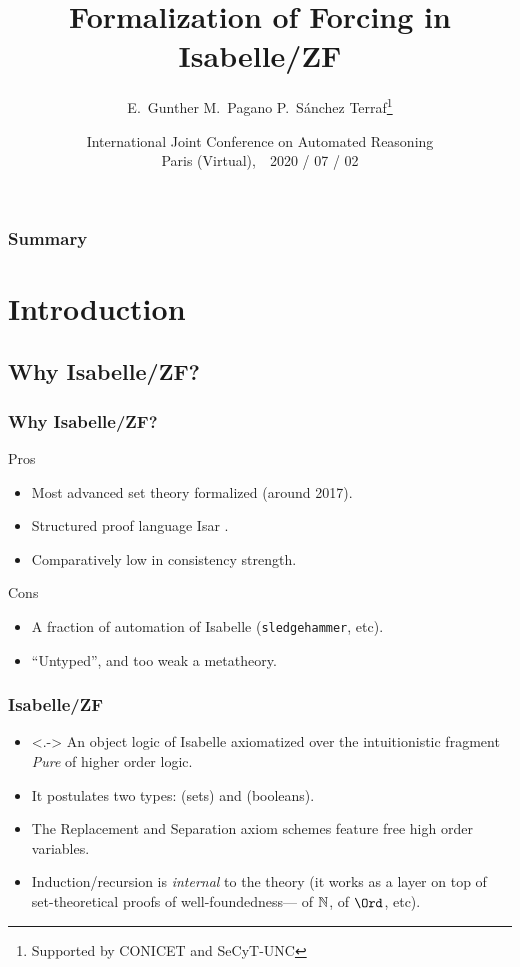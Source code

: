 \documentclass[english]{beamer}
\title[Forcing in Isabelle/ZF]{Formalization of Forcing in Isabelle/ZF}
\author[E.~Gunther, M.~Pagano, PST]{E.~Gunther \qquad M.~Pagano \qquad P.~Sánchez Terraf\thanks{Supported by
    CONICET and SeCyT-UNC} 
}
\institute[UNC]{CIEM-FaMAF --- Universidad Nacional de Córdoba}
\date[IJCAR 2020]{International Joint Conference on Automated
  Reasoning\\ Paris (Virtual),\ \  2020 / 07 / 02}
\begin{document}
\begin{frame}[plain]
  \titlepage
  \begin{center}
    \insertlogo
  \end{center}
\end{frame}
%
\begin{frame}
  \frametitle{Summary}
  \tableofcontents
  \transwipe
\end{frame}
%
\section{Introduction}

\subsection{Why Isabelle/ZF?}

\begin{frame}
  \frametitle{Why Isabelle/ZF?}
  \begin{block}{Pros}
    \begin{itemize}
    \item Most advanced set theory formalized (around 2017).
    \item Structured proof language Isar
      \citep{DBLP:conf/tphol/Wenzel99}.
    \item Comparatively low in consistency strength.
    \end{itemize}
  \end{block}
  \pause
  \begin{block}{Cons}
    \begin{itemize}
    \item A fraction of automation of Isabelle (\texttt{sledgehammer},
      etc).
    \item ``Untyped'', and too weak a metatheory.
    \end{itemize}
  \end{block}
\end{frame}

\begin{frame}
  \frametitle{Isabelle/ZF \citep{DBLP:journals/jar/PaulsonG96}}
  \begin{itemize}
  \item<.-> An object logic of Isabelle axiomatized over the
    intuitionistic fragment  \emph{Pure} of higher order logic.
  \item<+-> It postulates two types: 
    (sets) and  (booleans). 
  \item<+-> The Replacement and Separation axiom schemes feature free
    high order variables.
  \item<+-> Induction/recursion is \emph{internal} to the theory (it works as a
    layer on top of set-theoretical proofs of well-foundedness--- of
    $\mathbb{N}$, of $\Ord$, etc).
  \end{itemize}
\end{frame}
\end{document}
